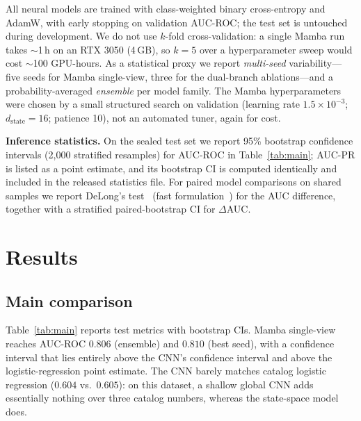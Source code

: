 \documentclass[conference]{IEEEtran}
\begin{document}
All neural models are trained with class-weighted binary cross-entropy and
AdamW, with early stopping on validation AUC-ROC; the test set is untouched
during development. We do not use $k$-fold cross-validation: a single Mamba run
takes $\sim$1\,h on an RTX 3050 (4\,GB), so $k{=}5$ over a hyperparameter sweep
would cost $\sim$100 GPU-hours. As a statistical proxy we report \emph{multi-seed}
variability---five seeds for Mamba single-view, three for the dual-branch
ablations---and a probability-averaged \emph{ensemble} per model family. The Mamba
hyperparameters were chosen by a small structured search on validation
(learning rate $1.5\times10^{-3}$; $d_{\text{state}}{=}16$; patience 10), not an
automated tuner, again for cost.

\textbf{Inference statistics.} On the sealed test set we report 95\% bootstrap
confidence intervals (2{,}000 stratified resamples) for AUC-ROC in
Table~\ref{tab:main}; AUC-PR is listed as a point estimate, and its bootstrap CI is
computed identically and included in the released statistics file.
For paired model comparisons on shared samples we report DeLong's
test~\cite{delong1988} (fast formulation~\cite{sun2014}) for the AUC difference,
together with a stratified paired-bootstrap CI for $\Delta$AUC.

\section{Results}

\subsection{Main comparison}

Table~\ref{tab:main} reports test metrics with bootstrap CIs.
Mamba single-view reaches AUC-ROC $0.806$ (ensemble) and $0.810$ (best seed),
with a confidence interval that lies entirely above the CNN's confidence interval
and above the logistic-regression point estimate. The CNN barely matches catalog
logistic regression ($0.604$ vs.\ $0.605$): on this dataset, a shallow global CNN
adds essentially nothing over three catalog numbers, whereas the state-space model
does.
\end{document}

